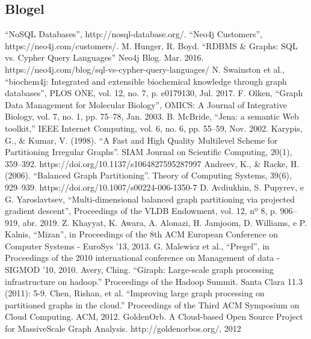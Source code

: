 \documentclass[conference]{IEEEtran}
\begin{document}
\subsection{Blogel}

\begin{thebibliography}{00}
 ``NoSQL Databases'', http://nosql-database.org/.
 ``Neo4j Customers'', https://neo4j.com/customers/.
 M. Hunger, R. Boyd. ``RDBMS \& Graphs: SQL vs. Cypher Query Languages'' Neo4j Blog. Mar. 2016. https://neo4j.com/blog/sql-vs-cypher-query-languages/
 N. Swainston et al., ``biochem4j: Integrated and extensible biochemical knowledge through graph databases'', PLOS ONE, vol. 12, no. 7, p. e0179130, Jul. 2017. 
 F. Olken, ``Graph Data Management for Molecular Biology'', OMICS: A Journal of Integrative Biology, vol. 7, no. 1, pp. 75–78, Jan. 2003.
 B. McBride, ``Jena: a semantic Web toolkit,” IEEE Internet Computing, vol. 6, no. 6, pp. 55–59, Nov. 2002.
 Karypis, G., \& Kumar, V. (1998). ``A Fast and High Quality Multilevel Scheme for Partitioning Irregular Graphs''. SIAM Journal on Scientific Computing, 20(1), 359–392. https://doi.org/10.1137/s1064827595287997
 Andreev, K., \& Racke, H. (2006). ``Balanced Graph Partitioning''. Theory of Computing Systems, 39(6), 929–939. https://doi.org/10.1007/s00224-006-1350-7
 D. Avdiukhin, S. Pupyrev, e G. Yaroslavtsev, ``Multi-dimensional balanced graph partitioning via projected gradient descent'', Proceedings of the VLDB Endowment, vol. 12, nº 8, p. 906–919, abr. 2019.
 Z. Khayyat, K. Awara, A. Alonazi, H. Jamjoom, D. Williams, e P. Kalnis, ``Mizan'', in Proceedings of the 8th ACM European Conference on Computer Systems - EuroSys ’13, 2013.
 G. Malewicz et al., ``Pregel'', in Proceedings of the 2010 international conference on Management of data - SIGMOD ’10, 2010.
 Avery, Ching. ``Giraph: Large-scale graph processing infrastructure on hadoop.'' Proceedings of the Hadoop Summit. Santa Clara 11.3 (2011): 5-9.
 Chen, Rishan, et al. ``Improving large graph processing on partitioned graphs in the cloud.'' Proceedings of the Third ACM Symposium on Cloud Computing. ACM, 2012.
 GoldenOrb. A Cloud-based Open Source Project for MassiveScale Graph Analysis. http://goldenorbos.org/, 2012

\end{thebibliography}
\end{document}
